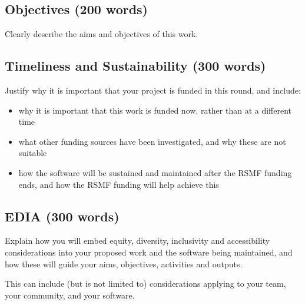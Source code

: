 \documentclass[12pt]{article}
\newenvironment{instruction}{%
    \begin{tcolorbox}[colback=red!5,colframe=red,title=Instruction]%
}{%
    \end{tcolorbox}%
}
\begin{document}


\subsection*{Objectives (200 words)}

\begin{instruction}

Clearly describe the aims and objectives of this work.

\end{instruction}



\subsection*{Timeliness and Sustainability (300 words)}

\begin{instruction}

Justify why it is important that your project is funded in this round, and include:

    \begin{itemize}
        \item why it is important that this work is funded now, rather than at a different time
        \item what other funding sources have been investigated, and why these are not suitable
        \item how the software will be sustained and maintained after the RSMF funding ends, and how the RSMF funding will help achieve this
    \end{itemize}

\end{instruction}

\subsection*{EDIA (300 words)}

\begin{instruction}
Explain how you will embed equity, diversity, inclusivity and accessibility considerations into your proposed work and the software being maintained, and how these will guide your aims, objectives, activities and outputs.

This can include (but is not limited to) considerations applying to your team, your community, and your software.
\end{instruction}
\end{document}
